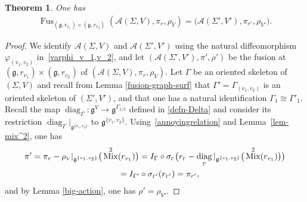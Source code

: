 \documentclass[10pt,a4paper]{amsart}
\numberwithin{equation}{section}
\newtheorem{Theorem}{Theorem}[section]
\def \g {\mathfrak{a}}
\def \g {\mathfrak{g}}
\def \A {{\mathcal{A}}}
\DeclareMathOperator{\diag}{diag}
\DeclareMathOperator{\Mix}{Mix}
\DeclareMathOperator{\Fus}{Fus}
\def \sV {{\scriptscriptstyle V}}
\def \sGam {{\scriptscriptstyle \Gamma}}
\begin{document}
\begin{Theorem} \label{thm-fuse-mark}One has
\begin{gather*}
\Fus_{(\g, r_{v_1}) \times (\g, r_{v_2})} (\A(\Sigma, V), \pi_r, \rho_\sV) = \big(\A(\Sigma', V'), \pi_{r'}, \rho_{\sV'}\big).
\end{gather*}
\end{Theorem}
\begin{proof}We identify $\A(\Sigma, V)$ and $\A(\Sigma', V')$ using the natural dif\/feomorphism $\varphi_{(v_1, v_2)}$ in~\eqref{varphi_v_1,v_2}, and let $(\A(\Sigma', V'), \pi', \rho')$ be the fusion at $(\g, r_{v_1}) \times (\g, r_{v_2})$ of $(\A(\Sigma, V), \pi_r, \rho_\sV)$. Let $\Gamma$ be an oriented skeleton of $(\Sigma, V)$ and recall from Lemma \ref{fusion-graph-surf} that $\Gamma' = \Gamma_{(v_1, v_2)}$ is an oriented skeleton of $(\Sigma', V')$, and that one has a natural identif\/ication $\Gamma_1 \cong \Gamma'_1$. Recall the map $\diag_{\sGam}\colon \g^{\sV} \to \g^{\sGam_{1/2}}$ def\/ined in \eqref{defn-Delta} and consider its restriction $\diag_{\sGam} |_{\g^{\{v_1, v_2\}}}$ to $\g^{\{v_1, v_2\}}$. Using~\eqref{annoyingrelation} and Lemma~\ref{lem-mix^2}, one has
\begin{gather*}
\pi' = \pi_r - \rho_\sV |_{\g^{\{v_1, v_2\}}}\big(\Mix^2(r_{v_1})\big)
= I_\Gamma \circ \sigma_{\sGam}\big( r_{\sGam} - \diag_{\sGam} |_{\g^{\{v_1, v_2\}}} \big(\Mix^2(r_{v_1})\big)\big)\\
\hphantom{\pi'}{} = I_{\Gamma'} \circ \sigma_{\sGam'}(r_{\sGam'}) = \pi_{r'},
\end{gather*}
and by Lemma \ref{big-action}, one has $\rho' = \rho_{\sV'}$.
\end{proof}
\end{document}
